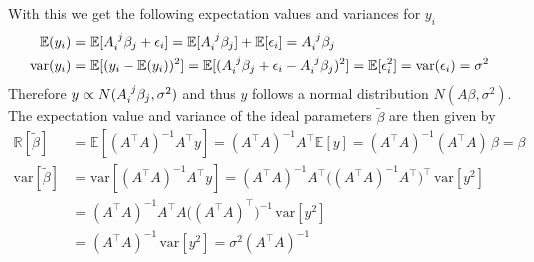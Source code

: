 \documentclass[12pt]{scrartcl}
\begin{document}
  With this we get the following expectation values and variances for $y_i$
  \begin{align}
  	\mathbb{E}(y_i) &= \mathbb{E}[\tensor{A}{_i^j}\beta_j  + \epsilon_i] = \mathbb{E}[\tensor{A}{_i^j}\beta_j] + \mathbb{E} [\epsilon_i] = \tensor{A}{_i^j}\beta_j \\
  	\text{var}(y_i) &= \mathbb{E}[(y_i - \mathbb{E}(y_i))^2]
  	=  	\mathbb{E}[(\tensor{A}{_i^j}\beta_j  + \epsilon_i - \tensor{A}{_i^j}\beta_j)^2]
  	= \mathbb{E}[\epsilon_i^2] = \text{var}(\epsilon_i) = \sigma^2
  \end{align}
  Therefore $y \propto N(\tensor{A}{_i^j}\beta_j, \sigma^2)$ and thus $y$ follows a normal distribution $N(A\beta,\sigma^2)$.
  \newline
  The expectation value and variance of the ideal parameters $\tilde{\beta}$ are then given by
  \begin{align}
    \mathbb{R}[\tilde{\beta}] &= \mathbb{E}[(A^\top A)^{-1} A^\top y] = (A^\top A)^{-1} A^\top \mathbb{E}[y] = (A^\top A)^{-1} (A^\top A) \, \beta = \beta  \\
  	\text{var}[\tilde{\beta}] &= \text{var}[(A^\top A)^{-1} A^\top y] = (A^\top A)^{-1} A^\top  \big((A^\top A)^{-1}A^\top\big)^\top \, \text{var}[y^2]\\
  	&= (A^\top A)^{-1} A^\top A \big((A^\top A)^{\top}\big)^{-1} \, \text{var}[y^2] \\
  	& = (A^\top A)^{-1} \, \text{var}[y^2] = \sigma^2 (A^\top A)^{-1} 
  \end{align}
\end{document}
